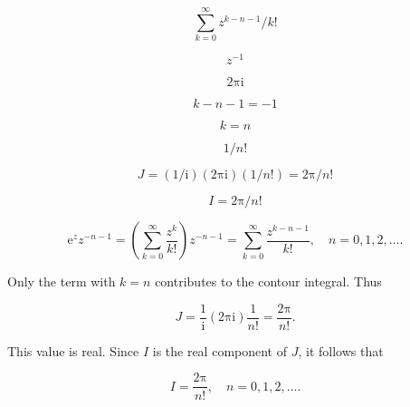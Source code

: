 \documentclass[11pt,a4paper]{article}
\theoremstyle{definition}
\theoremstyle{plain}
\begin{document}
\[
\sum_{k = 0}^{\infty}z^{k - n - 1}/k!
\]

\[
z^{-1}
\]

\[
2\mathrm{\pi}\mathrm{i}
\]

\[
k - n - 1 = -1
\]

\[
k = n
\]

\[
1/n!
\]

\[
J = (1/\mathrm{i})(2\mathrm{\pi}\mathrm{i})(1/n!) = 2\mathrm{\pi}/n!
\]

\[
I = 2\mathrm{\pi}/n!
\]

\[
\mathrm{e}^{z}z^{-n - 1} = \left(\sum_{k = 0}^{\infty}\frac{z^{k}}{k!}\right)z^{-n - 1} = \sum_{k = 0}^{\infty}\frac{z^{k - n - 1}}{k!}, \quad n = 0, 1, 2, \dots .
\]

Only the term with $k = n$ contributes to the contour integral. Thus

\begin{equation}
J = \frac{1}{\mathrm{i}}(2\mathrm{\pi}\mathrm{i})\frac{1}{n!} = \frac{2\mathrm{\pi}}{n!}.
\end{equation}

This value is real. Since $I$ is the real component of $J$, it follows that

\begin{equation}
I = \frac{2\mathrm{\pi}}{n!}, \quad n = 0, 1, 2, \dots .
\end{equation}
\end{document}
